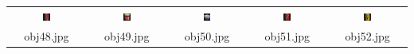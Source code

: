 \begin{table}[H]
\begin{tabu}{|ccccc|}
    \includegraphics[width=0.1\textwidth,height=0.1\textwidth]{imagens/coil_100/embalagens_cilindricas/obj62__80.png} &
    \includegraphics[width=0.1\textwidth,height=0.1\textwidth]{imagens/coil_100/embalagens_cilindricas/obj71__0.png} &
    \includegraphics[width=0.1\textwidth,height=0.1\textwidth]{imagens/coil_100/embalagens_cilindricas/obj87__0.png} &
    \includegraphics[width=0.1\textwidth,height=0.1\textwidth]{imagens/coil_100/embalagens_cilindricas/obj93__0.png} &
    \includegraphics[width=0.1\textwidth,height=0.1\textwidth]{imagens/coil_100/embalagens_cilindricas/obj99__0.png}
    \\
    \scriptsize{obj48.jpg} & \scriptsize{obj49.jpg} & \scriptsize{obj50.jpg} &
    \scriptsize{obj51.jpg} & \scriptsize{obj52.jpg}
  \end{tabu}
\end{table}

